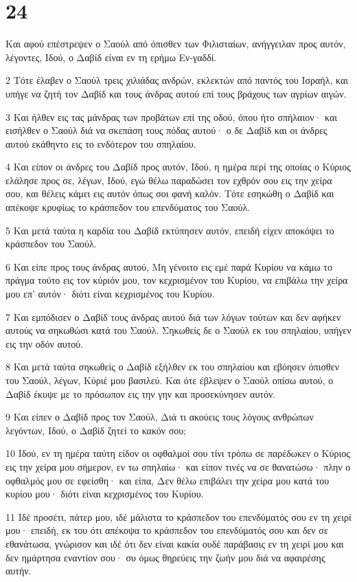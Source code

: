 \chapter{24}

\par Και αφού επέστρεψεν ο Σαούλ από όπισθεν των Φιλισταίων, ανήγγειλαν προς αυτόν, λέγοντες, Ιδού, ο Δαβίδ είναι εν τη ερήμω Εν-γαδδί.
\par 2 Τότε έλαβεν ο Σαούλ τρεις χιλιάδας ανδρών, εκλεκτών από παντός του Ισραήλ, και υπήγε να ζητή τον Δαβίδ και τους άνδρας αυτού επί τους βράχους των αγρίων αιγών.
\par 3 Και ήλθεν εις τας μάνδρας των προβάτων επί της οδού, όπου ήτο σπήλαιον· και εισήλθεν ο Σαούλ διά να σκεπάση τους πόδας αυτού· ο δε Δαβίδ και οι άνδρες αυτού εκάθηντο εις το ενδότερον του σπηλαίου.
\par 4 Και είπον οι άνδρες του Δαβίδ προς αυτόν, Ιδού, η ημέρα περί της οποίας ο Κύριος ελάλησε προς σε, λέγων, Ιδού, εγώ θέλω παραδώσει τον εχθρόν σου εις την χείρα σου, και θέλεις κάμει εις αυτόν όπως σοι φανή καλόν. Τότε εσηκώθη ο Δαβίδ και απέκοψε κρυφίως το κράσπεδον του επενδύματος του Σαούλ.
\par 5 Και μετά ταύτα η καρδία του Δαβίδ εκτύπησεν αυτόν, επειδή είχεν αποκόψει το κράσπεδον του Σαούλ.
\par 6 Και είπε προς τους άνδρας αυτού, Μη γένοιτο εις εμέ παρά Κυρίου να κάμω το πράγμα τούτο εις τον κύριόν μου, τον κεχρισμένον του Κυρίου, να επιβάλω την χείρα μου επ' αυτόν· διότι είναι κεχρισμένος του Κυρίου.
\par 7 Και εμπόδισεν ο Δαβίδ τους άνδρας αυτού διά των λόγων τούτων και δεν αφήκεν αυτούς να σηκωθώσι κατά του Σαούλ. Σηκωθείς δε ο Σαούλ εκ του σπηλαίου, υπήγεν εις την οδόν αυτού.
\par 8 Και μετά ταύτα σηκωθείς ο Δαβίδ εξήλθεν εκ του σπηλαίου και εβόησεν όπισθεν του Σαούλ, λέγων, Κύριέ μου βασιλεύ. Και ότε έβλεψεν ο Σαούλ οπίσω αυτού, ο Δαβίδ έκυψε με το πρόσωπον εις την γην και προσεκύνησεν αυτόν.
\par 9 Και είπεν ο Δαβίδ προς τον Σαούλ, Διά τι ακούεις τους λόγους ανθρώπων λεγόντων, Ιδού, ο Δαβίδ ζητεί το κακόν σου;
\par 10 Ιδού, εν τη ημέρα ταύτη είδον οι οφθαλμοί σου τίνι τρόπω σε παρέδωκεν ο Κύριος εις την χείρα μου σήμερον, εν τω σπηλαίω· και είπον τινές να σε θανατώσω· πλην ο οφθαλμός μου σε εφείσθη· και είπα, Δεν θέλω επιβάλει την χείρα μου κατά του κυρίου μου· διότι είναι κεχρισμένος του Κυρίου.
\par 11 Ιδέ προσέτι, πάτερ μου, ιδέ μάλιστα το κράσπεδον του επενδύματός σου εν τη χειρί μου· επειδή, εκ του ότι απέκοψα το κράσπεδον του επενδύματός σου και δεν σε εθανάτωσα, γνώρισον και ιδέ ότι δεν είναι κακία ουδέ παράβασις εν τη χειρί μου και δεν ημάρτησα εναντίον σου· συ όμως θηρεύεις την ζωήν μου διά να αφαιρέσης αυτήν.
